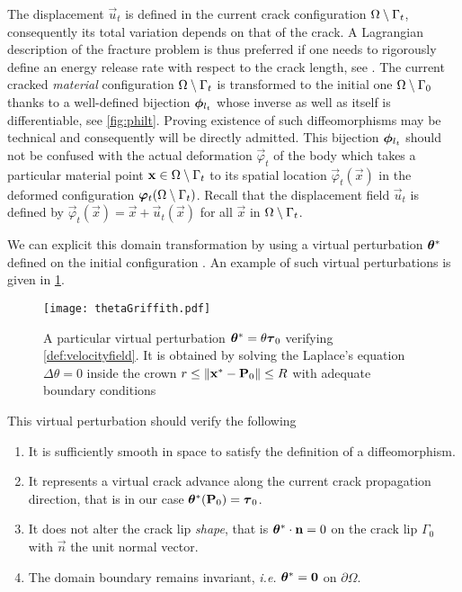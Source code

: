 The displacement $\vec{u}_t$ is defined in the current crack configuration ${\Omega\setminus\Gamma_t}$, consequently its total variation depends on that of the crack. A Lagrangian description of the fracture problem is thus preferred if one needs to rigorously define an energy release rate with respect to the crack length, see \cite{Destuynder:1981}. The current cracked \emph{material} configuration ${\Omega\setminus\Gamma_t}$ is transformed to the initial one ${\Omega\setminus\Gamma_0}$ thanks to a well-defined bijection $\philt_{l_t}$ whose inverse as well as itself is differentiable, see \cref{fig:philt}. Proving existence of such diffeomorphisms may be technical \cite{KhludnevSokolowskiSzulc:2010} and consequently will be directly admitted. This bijection $\philt_{l_t}$ should not be confused with the actual deformation $\vec{\varphi}_t$ of the body which takes a particular material point $\vec{x}\in\domaint$ to its spatial location $\vec{\varphi}_t(\vec{x})$ in the deformed configuration $\vec{\varphi}_t(\domaint)$. Recall that the displacement field $\vec{u}_t$ is defined by $\vec{\varphi}_t(\vec{x})=\vec{x}+\vec{u}_t(\vec{x})$ for all $\vec{x}$ in ${\Omega\setminus\Gamma_t}$.

We can explicit this domain transformation by using a virtual perturbation $\vtheta^*$ defined on the initial configuration \cite{Destuynder:1981,KhludnevSokolowskiSzulc:2010}. An example of such virtual perturbations is given in \cref{fig:exampletheta}.
\begin{figure}[htbp]
\centering
\texttt{[image: thetaGriffith.pdf]}
\caption{A particular virtual perturbation $\vtheta^*=\theta\vtau_0$ verifying \cref{def:velocityfield}. It is obtained by solving the Laplace's equation $\Delta\theta=0$ inside the crown $r\leq\norm{\vec{x}^*-\vec{P}_0}\leq R$ with adequate boundary conditions} \label{fig:exampletheta}
\end{figure}
This virtual perturbation should verify the following
\begin{definition} \label{def:velocityfield} \noindent
\begin{enumerate}
\item It is sufficiently smooth in space to satisfy the definition of a diffeomorphism.
\item It represents a virtual crack advance along the current crack propagation direction, that is in our case $\vtheta^*(\vec{P}_0)=\vtau_0$.
\item It does not alter the crack lip \emph{shape}, that is $\vtheta^*\cdot\vec{n}=0$ on the crack lip $\Gamma_0$ with $\vec{n}$ the unit normal vector.
\item The domain boundary remains invariant, \emph{i.e.} $\vtheta^*=\vec{0}$ on $\partial\Omega$.
\end{enumerate}
\end{definition}

